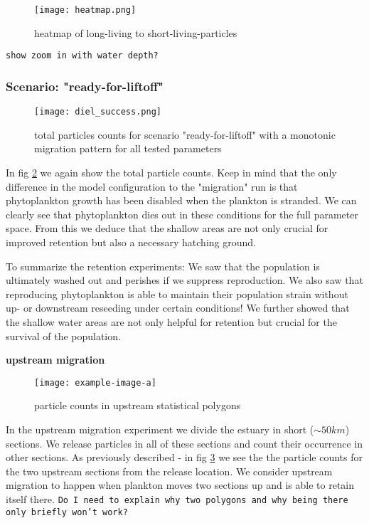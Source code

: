 \begin{figure}
    \texttt{[image: heatmap.png]}
    \caption[]{heatmap of long-living to short-living-particles}
    \label{fig:migration-long-vs-short-heatmap}
\end{figure}

\texttt{show zoom in with water depth?}

\subsubsection*{Scenario: "ready-for-liftoff"}

\begin{figure}
    \texttt{[image: diel\_success.png]}
    \caption[]{total particles counts for scenario "ready-for-liftoff" with a monotonic migration pattern for all tested parameters}
    \label{fig:stranded-monotonic-particle-counts}
\end{figure}

In fig \ref{fig:stranded-monotonic-particle-counts} we again show the total particle counts.
Keep in mind that the only difference in the model configuration to the "migration" run is that phytoplankton growth has been disabled when the plankton is stranded.
We can clearly see that phytoplankton dies out in these conditions for the full parameter space.
From this we deduce that the shallow areas are not only crucial for improved retention but also a necessary hatching ground.

To summarize the retention experiments: We saw that the population is ultimately washed out and perishes if we suppress reproduction.
We also saw that reproducing phytoplankton is able to maintain their population strain without up- or downstream reseeding under certain conditions!
We further showed that the shallow water areas are not only helpful for retention but crucial for the survival of the population.

\textbf{upstream migration}

\begin{figure}
    \texttt{[image: example-image-a]}
    \caption[]{particle counts in upstream statistical polygons}
    \label{fig:upstream-migration-statistical-poly-counts}
\end{figure}


In the upstream migration experiment we divide the estuary in short ($\sim 50km$) sections.
We release particles in all of these sections and count their occurrence in other sections.
As previously described - in fig \ref{fig:upstream-migration-statistical-poly-counts} we see the 
the particle counts for the two upstream sections from the release location.
We consider upstream migration to happen when plankton moves two sections up and is able to retain itself there.
\texttt{Do I need to explain why two polygons and why being there only briefly won't work?}

